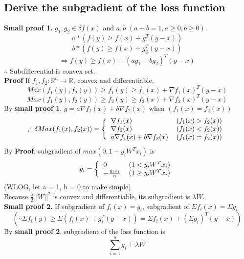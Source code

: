 \documentclass{article}
\begin{document}
\subsection {Derive the subgradient of the loss function}
\textbf {Small proof 1.} $g_1, g_2 \in \delta f(x)$ and $a, b$ $(a+b=1, a \geq 0, b\geq 0)$.
\[ a * ( f(y) \geq f(x) + g_1^T(y-x) )\]
\[ b * ( f(y) \geq f(x) + g_2^T(y-x) )\]
\[ \Rightarrow f(y) \geq f(x) + (ag_1 + bg_2)^T(y-x) \]
$\therefore$ Subdifferential is convex set.\\
\textbf{Proof} If $f_1, f_2 : \mathbb{R}^n \rightarrow \mathbb{R}$, convex and differentiable,
\[ Max(f_1(y), f_2(y)) \geq f_1(y) \geq f_1(x) + \nabla f_1(x)^T(y-x) \]
\[ Max(f_1(y), f_2(y)) \geq f_2(y) \geq f_2(x) + \nabla f_2(x)^T(y-x) \]
By \textbf{small proof 1}, $g = a\nabla f_1(x) + b\nabla f_2(x) $ when $(f_1(x) = f_2(x))$
\[\therefore \delta Max(f_1(x), f_2(x)) = \Bigg\{
\begin{tabular}{l r}
$ \nabla f_1(x) $ & $(f_1(x) > f_2(x))$ \\
$ \nabla f_2(x) $ & $(f_1(x) < f_2(x))$ \\
$ a\nabla f_1(x) + b\nabla f_2(x) $ & $(f_1(x) = f_2(x))$
\end{tabular}\]
By \textbf{Proof}, subgradient of $max(0, 1-y_iW^Tx_i)$ is
\[g_i = \bigg\{
\begin{tabular}{l r}
$ 0 $ & $(1 < y_iW^Tx_i)$ \\
$ -\frac{y_i x_i}{n} $ & $(1 \geq y_iW^Tx_i)$ 
\end{tabular}\]
(WLOG, let a = 1, b = 0 to make simple) \\
Because $\frac{\lambda}{2}||W||^2$ is convex and differentiable, its subgradient is $\lambda W$. \\
\textbf{Small proof 2.} If subgradient of $f_i(x) = g_i$, subgradient of $\Sigma{f_i(x)} = \Sigma{g_i}$
\[( \because \Sigma f_i(y) \geq \Sigma (f_i(x) + g_i^T(y-x)) = \Sigma f_i(x) + (\Sigma g_i)^T (y-x) )\]
By \textbf{small proof 2}, subgradient of the loss function is $$\sum_{i=1}^{n}g_i + \lambda W$$

\subsection {}


\end{document}
